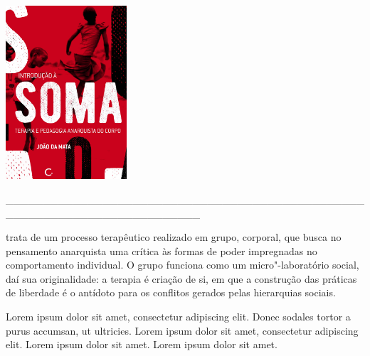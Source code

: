 \pagebreak

\hspace{.5cm}

\begin{center}
\hspace*{-.5cm}\includegraphics[width=45mm]{./imgs/soma.jpg}
\end{center}

\hspace*{-2cm}\_\_\_\_\_\_\_\_\_\_\_\_\_\_\_\_\_\_\_\_\_\_\_\_\_\_\_\_\_\_\_\_\_\_\_\_\_\_\_\_\_\_\_\_\_\_\_\_\_\_\_\_\_\_\_\_\_\_\_\_\_\_\_\_\_\_\_\_\_\_\_\_\_\_

\medskip

 trata de um processo terapêutico realizado em grupo, corporal, que busca no pensamento anarquista uma crítica às formas de poder impregnadas no comportamento individual. O grupo funciona como um micro"-laboratório social, daí sua originalidade: a terapia é criação de si, em que a construção das práticas de liberdade é o antídoto para os conflitos gerados pelas hierarquias sociais.

\hspace{.5cm}

\hspace*{-.4cm}\begin{minipage}[c]{0.45\linewidth}
\small{
{}}
\end{minipage}
\begin{minipage}[c]{0.50\linewidth}
\small{Lorem ipsum dolor sit amet, consectetur adipiscing elit.
Donec sodales tortor a purus accumsan, ut ultricies. Lorem ipsum dolor sit amet, consectetur adipiscing elit. Lorem ipsum dolor sit amet. Lorem ipsum dolor sit amet.} 
\end{minipage}

